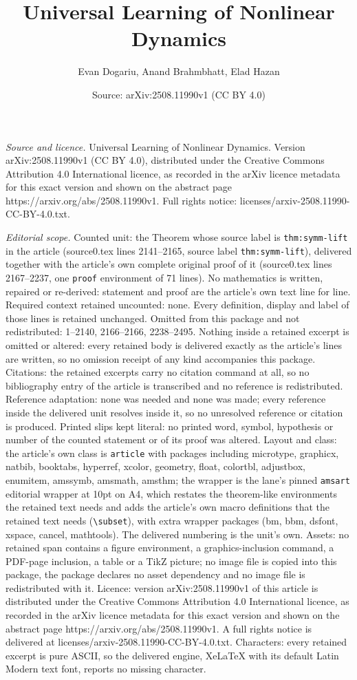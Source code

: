 \documentclass[10pt,a4paper]{amsart}
\title[Universal Learning of Nonlinear Dynamics]{Universal Learning of Nonlinear Dynamics}
\author{Evan Dogariu, Anand Brahmbhatt, Elad Hazan}
\date{Source: arXiv:2508.11990v1 (CC BY 4.0)}
\begin{document}
\maketitle

\noindent\emph{Source and licence.} Universal Learning of Nonlinear Dynamics. Version arXiv:2508.11990v1 (CC BY 4.0), distributed under the Creative Commons Attribution 4.0 International licence, as recorded in the arXiv licence metadata for this exact version and shown on the abstract page https://arxiv.org/abs/2508.11990v1. Full rights notice: licenses/arxiv-2508.11990-CC-BY-4.0.txt.\par\smallskip

\noindent\textit{Editorial scope.} Counted unit: the Theorem whose source label is \texttt{thm:symm-lift} in the article (source0.tex lines 2141--2165, source label \texttt{thm:symm-lift}), delivered together with the article's own complete original proof of it (source0.tex lines 2167--2237, one \texttt{proof} environment of 71 lines). No mathematics is written, repaired or re-derived: statement and proof are the article's own text line for line. Required context retained uncounted: none. Every definition, display and label of those lines is retained unchanged. Omitted from this package and not redistributed: 1--2140, 2166--2166, 2238--2495. Nothing inside a retained excerpt is omitted or altered: every retained body is delivered exactly as the article's lines are written, so no omission receipt of any kind accompanies this package. Citations: the retained excerpts carry no citation command at all, so no bibliography entry of the article is transcribed and no reference is redistributed. Reference adaptation: none was needed and none was made; every reference inside the delivered unit resolves inside it, so no unresolved reference or citation is produced. Printed slips kept literal: no printed word, symbol, hypothesis or number of the counted statement or of its proof was altered. Layout and class: the article's own class is \texttt{article} with packages including microtype, graphicx, natbib, booktabs, hyperref, xcolor, geometry, float, colortbl, adjustbox, enumitem, amssymb, amsmath, amsthm; the wrapper is the lane's pinned \texttt{amsart} editorial wrapper at 10pt on A4, which restates the theorem-like environments the retained text needs and adds the article's own macro definitions that the retained text needs (\texttt{\textbackslash subset}), with extra wrapper packages (bm, bbm, dsfont, xspace, cancel, mathtools). The delivered numbering is the unit's own. Assets: no retained span contains a figure environment, a graphics-inclusion command, a PDF-page inclusion, a table or a TikZ picture; no image file is copied into this package, the package declares no asset dependency and no image file is redistributed with it. Licence: version arXiv:2508.11990v1 of this article is distributed under the Creative Commons Attribution 4.0 International licence, as recorded in the arXiv licence metadata for this exact version and shown on the abstract page https://arxiv.org/abs/2508.11990v1. A full rights notice is delivered at licenses/arxiv-2508.11990-CC-BY-4.0.txt. Characters: every retained excerpt is pure ASCII, so the delivered engine, XeLaTeX with its default Latin Modern text font, reports no missing character.
\end{document}
